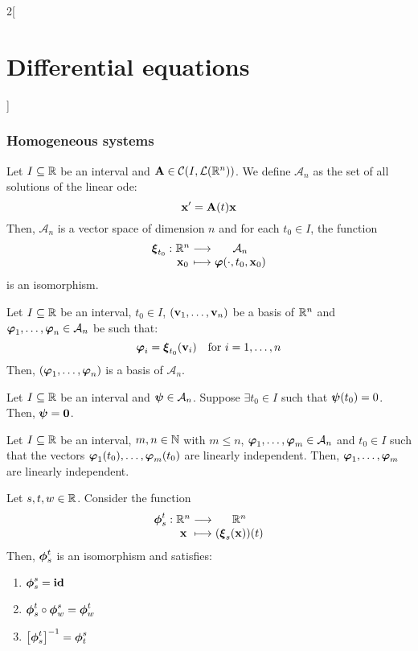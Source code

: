 \documentclass[../../../main.tex]{subfiles}
\begin{document}
\begin{multicols}{2}[\section{Differential equations}]
  \subsubsection{Homogeneous systems}
  \begin{theorem}
    Let $I\subseteq\mathbb{R}$ be an interval and $\boldsymbol{\mathrm{A}}\in\mathcal{C}(I,\mathcal{L}(\mathbb{R}^n))$. We define $\mathcal{A}_n$ as the set of all solutions of the linear ode:
    \begin{equation}\label{DE_homo}
      \boldsymbol{\mathrm{x}}'=\boldsymbol{\mathrm{A}}(t)\boldsymbol{\mathrm{x}}
    \end{equation} Then, $\mathcal{A}_n$ is a vector space of dimension $n$ and for each $t_0\in I$, the function
    $$
      \function{\vf{\xi}_{t_0}}{\RR^n}{\mathcal{A}_n}{\vf{x}_0}{\vf{\varphi}(\cdot,t_0,\vf{x}_0)}
    $$
    is an isomorphism.
  \end{theorem}
  \begin{corollary}
    Let $I\subseteq\mathbb{R}$ be an interval, $t_0\in I$, $(\boldsymbol{\mathrm{v}}_1,\ldots,\boldsymbol{\mathrm{v}}_n)$ be a basis of $\mathbb{R}^n$ and $\boldsymbol{\mathrm{\varphi}}_1,\ldots,\boldsymbol{\mathrm{\varphi}}_n\in\mathcal{A}_n$ be such that: $$\boldsymbol{\mathrm{\varphi}}_i=\boldsymbol{\mathrm{\xi}}_{t_0}(\boldsymbol{\mathrm{v}}_i)\quad\text{for } i=1,\ldots,n$$
    Then, $(\boldsymbol{\mathrm{\varphi}}_1,\ldots,\boldsymbol{\mathrm{\varphi}}_n)$ is a basis of $\mathcal{A}_n$.
  \end{corollary}
  \begin{corollary}
    Let $I\subseteq\mathbb{R}$ be an interval and $\boldsymbol{\mathrm{\psi}}\in\mathcal{A}_n$. Suppose $\exists t_0\in I$ such that $\boldsymbol{\mathrm{\psi}} (t_0)=0$. Then, $\boldsymbol{\mathrm{\psi}}=\boldsymbol{\mathrm{0}}$.
  \end{corollary}
  \begin{corollary}
    Let $I\subseteq\mathbb{R}$ be an interval, $m,n\in\mathbb{N}$ with $m\leq n$, $\boldsymbol{\mathrm{\varphi}}_1,\ldots,\boldsymbol{\mathrm{\varphi}}_m\in\mathcal{A}_n$ and $t_0\in I$ such that the vectors $\boldsymbol{\mathrm{\varphi}}_1(t_0),\ldots,\boldsymbol{\mathrm{\varphi}}_m(t_0)$ are linearly independent. Then, $\boldsymbol{\mathrm{\varphi}}_1,\ldots,\boldsymbol{\mathrm{\varphi}}_m$ are linearly independent.
  \end{corollary}
  \begin{corollary}
    Let $s,t,w\in\mathbb{R}$. Consider the function
    $$
      \function{\vf{\phi}_s^t}{\RR^n}{\RR^n}{\vf{x}}{(\vf{\xi}_s(\vf{x}))(t)}
    $$
    Then, $\boldsymbol{\mathrm{\phi}}_s^t$ is an isomorphism and satisfies:
    \begin{enumerate}
      \item $\boldsymbol{\mathrm{\phi}}_s^s=\boldsymbol{\mathrm{\mathrm{id}}}$
      \item $\boldsymbol{\mathrm{\phi}}_s^t\circ\boldsymbol{\mathrm{\phi}}_w^s=\boldsymbol{\mathrm{\phi}}_w^t$
      \item ${\left[\boldsymbol{\mathrm{\phi}}_s^t\right]}^{-1}=\boldsymbol{\mathrm{\phi}}_t^s$

\end{enumerate}
\end{corollary}
\end{multicols}
\end{document}
